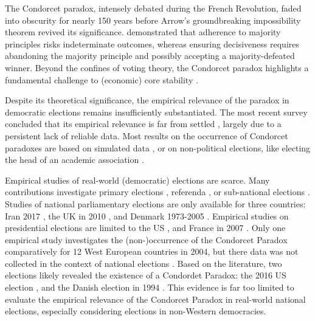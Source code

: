 \documentclass[12pt]{scrartcl}
\begin{document}
The Condorcet paradox, intensely debated during the French Revolution, faded into obscurity for nearly 150 years \citep[][p.~99]{Rothschild2005, McLean2019} before Arrow’s groundbreaking impossibility theorem revived its significance. \citet{Arrow1950} demonstrated that adherence to majority principles risks indeterminate outcomes, whereas ensuring decisiveness requires abandoning the majority principle and possibly accepting a majority-defeated winner. Beyond the confines of voting theory, the Condorcet paradox highlights a fundamental challenge to (economic) core stability \citep{Moulin2014}.

Despite its theoretical significance, the empirical relevance of the paradox in democratic elections remains insufficiently substantiated. The most recent survey concluded that its empirical relevance is far from settled \citep{VanDeemen2013}, largely due to a persistent lack of reliable data. Most results on the occurrence of Condorcet paradoxes are based on simulated data \citep{Lepelley2001, Gehrlein2006, Sauermann2022}, or on non-political elections, like electing the head of an academic association \citep{Chamberlin1984, Feld1992, Regenwetter2007, Tideman2009, Popov2014}.

Empirical studies of real-world (democratic) elections are scarce. Many contributions investigate primary elections \citep{Kurrild2018}, referenda \citep{Bochsler2010, Justesen2007},  or sub-national elections \citep{Munkoe2014, Darmann2023}.  Studies of national parliamentary elections are only available for three countries: Iran 2017 \citep{Feizi2020}, the UK in 2010 \citep{Abramson2013}, and Denmark  1973-2005 \citep{vanDeemen1998, KurrildKlitgaard2001, KurrildKlitgaard2008}. Empirical studies on presidential elections are limited to the US  \citep{Riker1988, Abramson1995, Potthoff2021}, and France in 2007 \citep{Abramson2007}. Only one empirical study investigates the (non-)occurrence of the Condorcet Paradox comparatively for 12 West European countries in 2004,  but there  data was not collected in the context of national elections \citep{McDonald2012}. Based on the literature, two elections likely revealed the existence of a Condordet Paradox: the 2016 US election \citep{Potthoff2021}, and the Danish election in 1994 \citep{KurrildKlitgaard2008}.  This  evidence is far too limited to evaluate the empirical relevance of the Condorcet Paradox in real-world national elections,  especially considering elections in non-Western democracies.  
\end{document}

